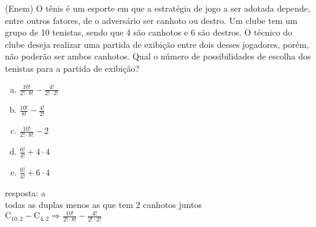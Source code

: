 \begin{ex}
 (Enem) O tênis é um esporte em que a estratégia de jogo a ser adotada depende, entre outros fatores, de o adversário ser canhoto ou destro. Um clube tem um grupo de 10 tenistas, sendo que 4 são canhotos e 6 são destros. O técnico do clube deseja realizar uma partida de exibição entre dois desses jogadores, porém, não poderão ser ambos canhotos. Qual o número de possibilidades de escolha dos tenistas para a partida de exibição?
    \begin{enumerate}[(a)]
    \item  $\frac{10!}{2!\cdot8!}-\frac{4!}{2!\cdot2!}$
    \item  $\frac{10!}{8!}-\frac{4!}{2!}$
    \item  $\frac{10!}{2!\cdot8!}-2$ 
    \item  $\frac{6!}{4!}+4\cdot4$
    \item  $\frac{6!}{4!}+6\cdot4$
    \end{enumerate}
      \begin{sol}
       resposta: a \\
       todas as duplas menos as que tem 2 canhotos juntos \\
       $\mathrm{C}_{{10},2}-\mathrm{C}_{4,2}\Longrightarrow\frac{10!}{2!\cdot8!}-\frac{4!}{2!\cdot2!}$
      \end{sol}
    
\end{ex}